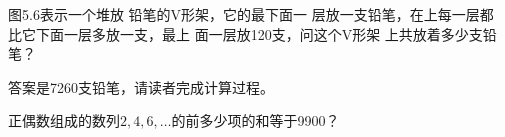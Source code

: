 \begin{example}
图5.6表示一个堆放
铅笔的V形架，它的最下面一
层放一支铅笔，在上每一层都
比它下面一层多放一支，最上
面一层放120支，问这个V形架
上共放着多少支铅笔？

答案是7260支铅笔，请读者完成计算过程。
\end{example}

\begin{example}
    正偶数组成的数列$2,4,6,\ldots$的前多少项的和等于9900？
\end{example}

\begin{analyze}
    
\end{analyze}

















































































































